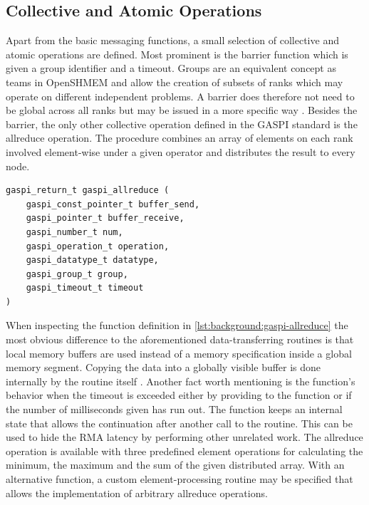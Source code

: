 \subsection{Collective and Atomic Operations}
\label{ssec:background:gaspi:collective-atomic}

Apart from the basic messaging functions, a small selection of collective and atomic operations are defined. Most prominent is the barrier function  which is given a group identifier and a timeout. Groups are an equivalent concept as teams in \ac{OpenSHMEM} and allow the creation of subsets of ranks which may operate on different independent problems. A barrier does therefore not need to be global across all ranks but may be issued in a more specific way \cite[ch.~11.2.1]{gaspi-std}. Besides the barrier, the only other collective operation defined in the \ac{GASPI} standard is the allreduce operation. The procedure combines an array of elements on each rank involved element-wise under a given operator and distributes the result to every node. 

\begin{lstlisting}[style=cpp,captionpos={b},caption={Function definition of \code{gaspi\_allreduce} {\cite[ch.~11.3.1]{gaspi-std}}.},label=lst:background:gaspi-allreduce]
gaspi_return_t gaspi_allreduce ( 
	gaspi_const_pointer_t buffer_send,
	gaspi_pointer_t buffer_receive,
	gaspi_number_t num,
	gaspi_operation_t operation,
	gaspi_datatype_t datatype,
	gaspi_group_t group,
	gaspi_timeout_t timeout
)
\end{lstlisting}

When inspecting the function definition in \autoref{lst:background:gaspi-allreduce} the most obvious difference to the aforementioned data-transferring routines is that local memory buffers are used instead of a memory specification inside a global memory segment. Copying the data into a globally visible buffer is done internally by the routine itself \cite[ch.~11.3.1]{gaspi-std}. Another fact worth mentioning is the function's behavior when the timeout is exceeded either by providing  to the function or if the number of milliseconds given has run out. The function keeps an internal state that allows the continuation after another call to the routine. This can be used to hide the \ac{RMA} latency by performing other unrelated work. The allreduce operation is available with three predefined element operations for calculating the minimum, the maximum and the sum of the given distributed array. With an alternative function, a custom element-processing routine may be specified that allows the implementation of arbitrary allreduce operations.

